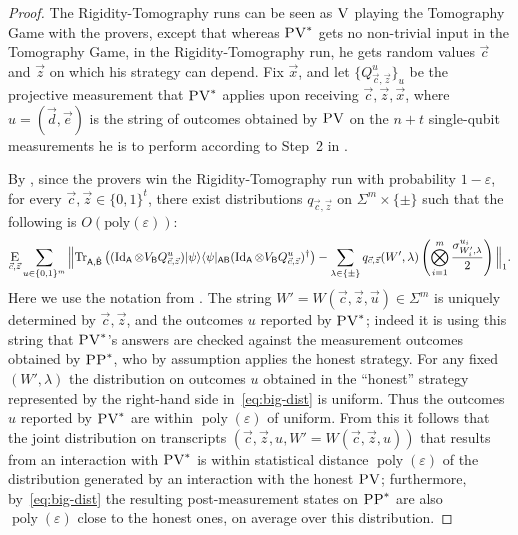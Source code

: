 \documentclass{toc}
\newcommand{\ket}[1]{|#1\rangle}
\newcommand{\bra}[1]{\langle#1|}
\newcommand{\Tr}{\mbox{\rm Tr}}
\newcommand{\Id}{\ensuremath{\mathop{\rm Id}\nolimits}}
\newcommand{\Es}[1]{\ensuremath{\mathop{\textsc{E}}}_{#1}} %
\DeclareMathOperator{\poly}{poly}
\newcommand{\reg}[1]{{\textsf{#1}}}
\newcommand{\eps}{\varepsilon}
\newcommand{\ver}{\textsc{V}}
\newcommand{\pv}{\textsc{PV}}
\newcommand{\pp}{\textsc{PP}}
\begin{document}
\begin{proof}
The Rigidity-Tomography runs can be seen as $\ver$ playing the Tomography Game
  with the provers, except that whereas $\pv^*$ gets no non-trivial input in the
  Tomography Game, in the Rigidity-Tomography run, he gets random values
  $\vec{c}$ and $\vec{z}$ on which his strategy can depend. Fix $\vec{x}$, and let
  $\{Q_{\vec{c},\vec{z}}^{u}\}_{u}$ be the projective measurement that $\pv^*$
  applies upon receiving $\vec{c},\vec{z},\vec{x}$, where  $u = (\vec{d},\vec{e})$ is
  the string of outcomes obtained by $\pv$ on the $n+t$ single-qubit
  measurements he is to perform according to Step~2 in
  . 

By , since the provers win the Rigidity-Tomography run with probability $1-\eps$, for every $\vec{c},\vec{z}\in\{0,1\}^t$,
there exist distributions $q_{\vec{c},\vec{z}}$ on $\Sigma^m\times\{\pm\}$ such that the following is $O(\mathrm{poly}(\eps))$:
\begin{equation}\label{eq:big-dist}
\Es{\vec{c},\vec{z}}\sum_{ u\in \{0, 1\}^m}
\Big\| \Tr_{\reg{A},\hat{\reg{B}}}\left((\Id_{\reg{A}}\otimes V_{\reg{B}} Q_{\vec{c},\vec{z}}^{u})\ket{\psi}\bra{\psi}_{\reg{AB}}(\Id_{\reg{A}}\otimes V_{\reg{B}} Q_{\vec{c},\vec{z}}^{u})^\dagger\right)
- \sum_{\lambda\in\{\pm\}}q_{\vec{c},\vec{z}}(W',\lambda)\left(\bigotimes_{i=1}^m \frac{\sigma^{u_i}_{W_i',\lambda}}{2}\right)\Big\|_1. 
\end{equation}
Here we use the notation from 
. The string
  $W'=W(\vec{c},\vec{z},\vec{u})\in\Sigma^m$ is uniquely determined by
  $\vec{c},\vec{z}$, and the outcomes ${u}$ reported by $\pv^*$; indeed it
  is using this string that $\pv^*$'s answers are checked against the
  measurement outcomes obtained by $\pp^*$, who by assumption applies the
  honest strategy. For any fixed $(W',\lambda)$ the distribution on
  outcomes $u$ obtained in the ``honest'' strategy represented by the right-hand
  side in~\eqref{eq:big-dist} is uniform. Thus the outcomes $u$ reported by
  $\pv^*$ are within $\poly(\eps)$ of uniform. From this it follows that the joint distribution on transcripts $(\vec{c},\vec{z},u,W'=W(\vec{c},\vec{z},u))$ that results from an interaction with $\pv^*$ is within statistical distance $\poly(\eps)$ of the distribution generated by an interaction with the honest $\pv$; furthermore, by~\eqref{eq:big-dist} the resulting post-measurement states on $\pp^*$ are also $\poly(\eps)$ close to the honest ones, on average over this distribution. 


\end{proof}
\end{document}
